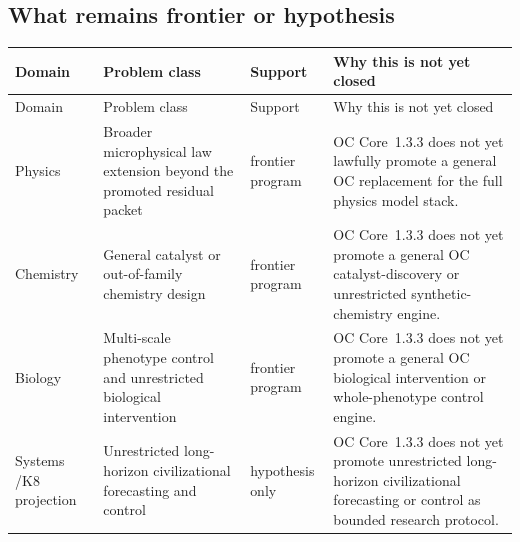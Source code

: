 \subsection{What remains frontier or hypothesis}
\begingroup
\scriptsize
\setlength{\emergencystretch}{1.5em}
\setlength{\tabcolsep}{2pt}
\setlength{\LTleft}{0pt}
\setlength{\LTright}{0pt}
\begin{longtable}{@{}L{0.11\textwidth}L{0.19\textwidth}L{0.14\textwidth}L{0.48\textwidth}@{}}
\toprule
Domain & Problem class & Support & Why this is not yet closed \\
\midrule
\endfirsthead
\toprule
Domain & Problem class & Support & Why this is not yet closed \\
\midrule
\endhead
Physics & Broader microphysical law extension beyond the promoted residual packet & frontier program & OC Core~1.3.3 does not yet lawfully promote a general OC replacement for the full physics model stack. \\
Chemistry & General catalyst or out-of-family chemistry design & frontier program & OC Core~1.3.3 does not yet promote a general OC catalyst-discovery or unrestricted synthetic-chemistry engine. \\
Biology & Multi-scale phenotype control and unrestricted biological intervention & frontier program & OC Core~1.3.3 does not yet promote a general OC biological intervention or whole-phenotype control engine. \\
Systems /\allowbreak K8 projection & Unrestricted long-horizon civilizational forecasting and control & hypothesis only & OC Core~1.3.3 does not yet promote unrestricted long-horizon civilizational forecasting or control as bounded research protocol. \\
\bottomrule
\end{longtable}
\endgroup
